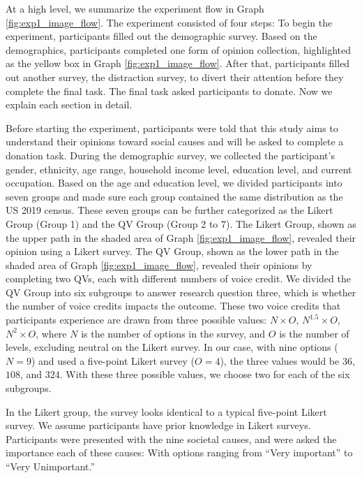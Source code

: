 At a high level, 
we summarize the experiment flow 
in Graph \ref{fig:exp1_image_flow}.
The experiment consisted of four steps:
To begin the experiment, 
participants filled out the demographic survey.
Based on the demographics,
participants completed one form of opinion collection,
highlighted as the yellow box
in Graph \ref{fig:exp1_image_flow}.
After that, 
participants filled out another survey,
the distraction survey,
to divert their attention before they complete the final task.
The final task asked participants to donate.
Now we explain each section in detail.

Before starting the experiment,
participants were told that 
this study aims to understand their opinions 
toward social causes and will be asked to complete a donation task.
During the demographic survey, 
we collected the participant's gender, ethnicity, age range, household income level, 
education level, and current occupation.
Based on the age and education level,
we divided participants into seven groups
and made sure each group contained the same distribution
as the US 2019 census.
These seven groups can be further categorized as
the Likert Group (Group 1) and the QV Group (Group 2 to 7).
The Likert Group, shown as the upper path in the shaded area of Graph \ref{fig:exp1_image_flow}, 
revealed their opinion using a Likert survey.
The QV Group, shown as the lower path in the shaded area of Graph \ref{fig:exp1_image_flow}, 
revealed their opinions by completing two QVs, each with different numbers of voice credit.
We divided the QV Group into six subgroups
to answer research question three, 
which is whether the number of voice credits impacts the outcome.
These two voice credits that participants experience 
are drawn from three possible values: $N \times O$, $N^1.5 \times O$, $N^2 \times O$, 
where $N$ is the number of options in the survey, 
and $O$ is the number of levels, 
excluding neutral on the Likert survey. %
In our case, with nine options ($N=9$) and
used a five-point Likert survey ($O=4$), 
the three values would be $36$, $108$, and $324$.
With these three possible values, 
we choose two for each of the six subgroups.

In the Likert group, 
the survey looks identical to a typical five-point Likert survey.
We assume participants have prior knowledge in Likert surveys.
Participants were presented with the nine societal causes, 
and were asked the importance each of these causes: 
With options ranging from ``Very important'' to ``Very Unimportant.''

